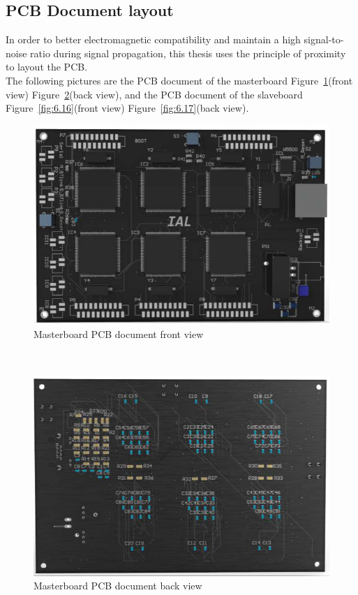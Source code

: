 \subsection{PCB Document layout}
\label{sec:PCB Document layout}
In order to better electromagnetic compatibility and maintain a high signal-to-noise ratio during signal propagation, this thesis uses the principle of proximity to layout the PCB.
\\
The following pictures are the PCB document of the masterboard Figure~\ref{fig:6.14}(front view) Figure~\ref{fig:6.15}(back view), and the PCB document of the slaveboard Figure~\ref{fig:6.16}(front view) Figure~\ref{fig:6.17}(back view).

\begin{figure}[!ht]
	\centering
	\includegraphics[width=16cm]{grafiken/6.14.pdf}
	\caption{Masterboard PCB document front view} 
	\label{fig:6.14}
\end{figure}
\FloatBarrier
\\


\begin{figure}[!ht]
	\centering
	\includegraphics[width=16cm]{grafiken/6.15.pdf}
	\caption{Masterboard PCB document back view} 
	\label{fig:6.15}
\end{figure}
\FloatBarrier
\\


